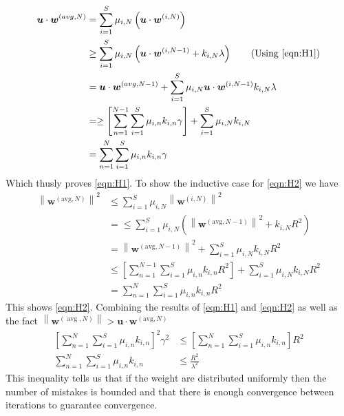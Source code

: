 \begingroup
\allowdisplaybreaks
\begin{align*}
    \bm{u} \cdot \bm{w}^{(avg,N)} &= \sum_{i=1}^{S} \mu_{i,N} \left( \bm{u} \cdot \bm{w}^{(i,N)} \right) \\
    &\geq \sum_{i=1}^{S} \mu_{i,N} \left( \bm{u} \cdot \bm{w}^{(i,N-1)} + k_{i,N} \lambda \right) \tag{Using \ref{eqn:H1}} \\
    &= \bm{u} \cdot \bm{w}^{(avg,N-1)} + \sum_{i=1}^{S} \mu_{i,N} \bm{u} \cdot \bm{w}^{(i,N-1)} k_{i,N} \lambda \\
    &= \geq\left[\sum_{n=1}^{N-1} \sum_{i=1}^{S} \mu_{i, n} k_{i, n} \gamma\right]+\sum_{i=1}^{S} \mu_{i, N} k_{i, N} \\
    &= \sum_{n=1}^{N} \sum_{i=1}^{S} \mu_{i, n} k_{i, n} \gamma
\end{align*}
\endgroup
Which thusly proves \ref{eqn:H1}. To show the inductive case for \ref{eqn:H2} we have
\begingroup
\allowdisplaybreaks
\begin{align*}
    \left\|\mathbf{w}^{(\mathrm{avg}, N)}\right\|^{2} &\leq \sum_{i=1}^{S} \mu_{i, N}\left\|\mathbf{w}^{(i, N)}\right\|^{2} \\
    &= \leq \sum_{i=1}^{S} \mu_{i, N}\left(\left\|\mathbf{w}^{(\mathrm{avg}, N-1)}\right\|^{2}+k_{i, N} R^{2}\right) \\
    &= \left\|\mathbf{w}^{(\mathrm{avg}, N-1)}\right\|^{2}+\sum_{i=1}^{S} \mu_{i, N} k_{i, N} R^{2} \\
    &\leq \left[\sum_{n=1}^{N-1} \sum_{i=1}^{S} \mu_{i, n} k_{i, n} R^{2}\right]+\sum_{i=1}^{S} \mu_{i, N} k_{i, N} R^{2} \\
    &= \sum_{n=1}^{N} \sum_{i=1}^{S} \mu_{i, n} k_{i, n} R^{2}
\end{align*}
\endgroup
This shows \ref{eqn:H2}. Combining the results of \ref{eqn:H1} and \ref{eqn:H2} as well as the fact $\left\|\mathbf{w}^{(\operatorname{avg}, N)}\right\|>\mathbf{u} \cdot \mathbf{w}^{(\mathrm{avg}, N)}$
\begin{align*}
    \left[\sum_{n=1}^{N} \sum_{i=1}^{S} \mu_{i, n} k_{i, n}\right]^{2} \gamma^{2} &\leq \left[\sum_{n=1}^{N} \sum_{i=1}^{S} \mu_{i, n} k_{i, n}\right] R^{2} \\
    \sum_{n=1}^{N} \sum_{i=1}^{S} \mu_{i, n} k_{i, n} &\leq \frac{R^2}{\lambda^2}
\end{align*}
This inequality tells us that if the weight are distributed uniformly then the number of mistakes is bounded and that there is enough convergence between iterations to guarantee convergence.